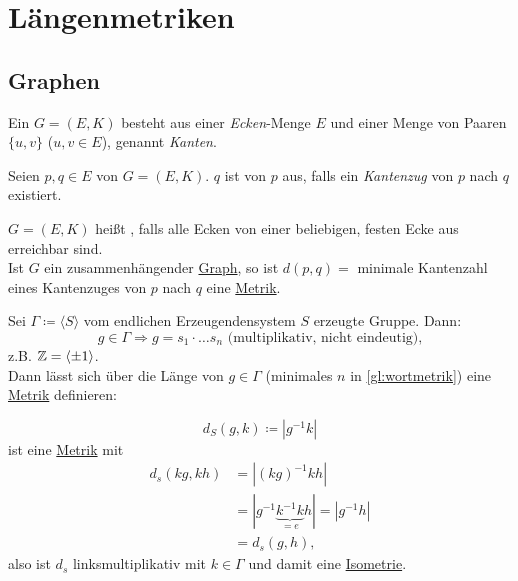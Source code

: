 \chapter{Längenmetriken}

\section{Graphen}

\begin{definition}[Graph]
  \label{def:graph}
  Ein  $ G = (E, K) $ besteht aus einer \emph{Ecken}-Menge $ E $ und einer Menge von Paaren $ \{ u, v \} $ ($ u, v \in E $), genannt \emph{Kanten}.
\end{definition}

\begin{definition}[Erreichbarkeit]
  Seien $ p, q \in E $ von $ G = (E, K) $. $ q $ ist  von $ p $ aus, falls ein \emph{Kantenzug} von $ p $ nach $ q $ existiert.
\end{definition}

\begin{definition}[Zusammenhängend]
  $ G = (E, K) $ heißt , falls alle Ecken von einer beliebigen, festen Ecke aus erreichbar sind.
  \\
  Ist $ G $ ein zusammenhängender \hyperref[def:graph]{Graph}, so ist $ d(p, q) = $ minimale Kantenzahl eines Kantenzuges von $ p $ nach $ q $ eine \hyperref[def:metrik]{Metrik}.
\end{definition}

\begin{example}[Wortmetrik]
  Sei $ \Gamma \coloneqq \langle S \rangle $ vom endlichen Erzeugendensystem $ S $ erzeugte Gruppe. Dann:
  \begin{equation}
    \label{gl:wortmetrik}
    g \in \Gamma \Rightarrow g = s_1\cdot \dots s_n\text{ (multiplikativ, nicht eindeutig),}
  \end{equation}
  z.B. $ \mathbb{Z} = \langle \pm 1 \rangle $. \\
  Dann lässt sich über die Länge von $ g \in \Gamma $ (minimales $ n $ in \autoref{gl:wortmetrik}) eine \hyperref[def:metrik]{Metrik} definieren:
\end{example}

\begin{definition}[Wortmetrik]
  \label{def:wortmetrik}
  \begin{equation*}
    d_S(g, k) \coloneqq |g^{-1}k|
  \end{equation*}
  ist eine \hyperref[def:metrik]{Metrik} mit
  \begin{align*}
    d_s(kg,kh) &= |(kg)^{-1}kh| \\ 
    &= |g^{-1}\underbrace{k^{-1}k}_{=e}h| = |g^{-1}h| \\
    &= d_s(g,h)\text{,}
  \end{align*}
  also ist $ d_s $ linksmultiplikativ mit $ k \in \Gamma $ und damit eine \hyperref[def:isometrie]{Isometrie}.
\end{definition}

